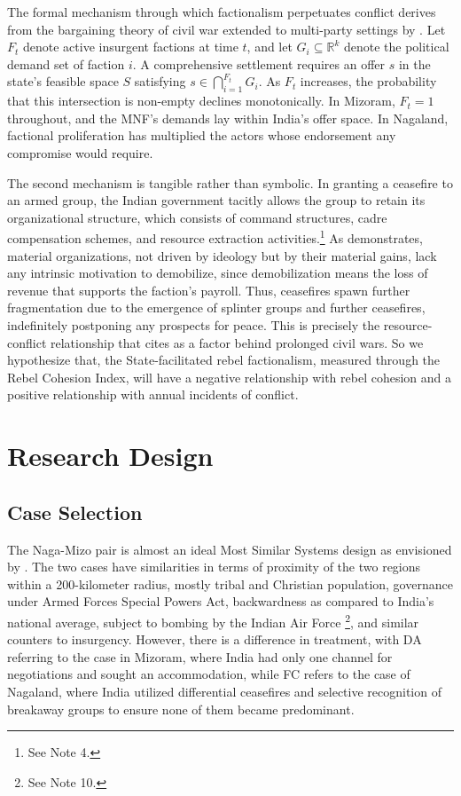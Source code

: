 \documentclass[12pt,a4paper]{article}
\begin{document}
The formal mechanism through which factionalism perpetuates conflict derives from the bargaining theory of civil war \citep{fearon1995} extended to multi-party settings by \citet{cunningham2009}. Let $F_t$ denote active insurgent factions at time $t$, and let $G_i \subseteq \mathbb{R}^k$ denote the political demand set of faction $i$. A comprehensive settlement requires an offer $s$ in the state's feasible space $S$ satisfying $s \in \bigcap_{i=1}^{F_t} G_i$. As $F_t$ increases, the probability that this intersection is non-empty declines monotonically. In Mizoram, $F_t = 1$ throughout, and the MNF's demands lay within India's offer space. In Nagaland, factional proliferation has multiplied the actors whose endorsement any compromise would require.

The second mechanism is tangible rather than symbolic. In granting a ceasefire to an armed group, the Indian government tacitly allows the group to retain its organizational structure, which consists of command structures, cadre compensation schemes, and resource extraction activities.\footnote{See Note 4.} As \citet{weinstein2007} demonstrates, material organizations, not driven by ideology but by their material gains, lack any intrinsic motivation to demobilize, since demobilization means the loss of revenue that supports the faction’s payroll. Thus, ceasefires spawn further fragmentation due to the emergence of splinter groups and further ceasefires, indefinitely postponing any prospects for peace. This is precisely the resource-conflict relationship that \citet{fearon2004} cites as a factor behind prolonged civil wars. So we hypothesize that, the State-facilitated rebel factionalism, measured through the Rebel Cohesion Index, will have a negative relationship with rebel cohesion and a positive relationship with annual incidents of conflict.

\section{Research Design}
\subsection{Case Selection}

The Naga-Mizo pair is almost an ideal Most Similar Systems design as envisioned by \citet{przeworski1970}. The two cases have similarities in terms of proximity of the two regions within a 200-kilometer radius, mostly tribal and Christian population, governance under Armed Forces Special Powers Act, backwardness as compared to India’s national average, subject to bombing by the Indian Air Force \footnote{See Note 10.}, and similar counters to insurgency. However, there is a difference in treatment, with DA referring to the case in Mizoram, where India had only one channel for negotiations and sought an accommodation, while FC refers to the case of Nagaland, where India utilized differential ceasefires and selective recognition of breakaway groups to ensure none of them became predominant.
\end{document}

